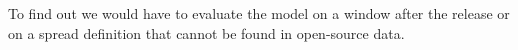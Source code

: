 To find out we would have to evaluate the model on a window after the release or on a spread definition that cannot be found in open-source data.
%
%
%

